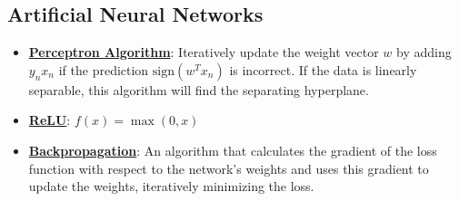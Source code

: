 \documentclass{article}%
\begin{document}
%
\subsection{Artificial Neural Networks}%
\label{subsec:ArtificialNeuralNetworks}%
\begin{itemize}[leftmargin=*]%
\item \href{https://purdue.brightspace.com/d2l/common/assets/pdfjs-d2l-dist/1.0.14-legacy/web/viewer.html?file=\%2Fcontent\%2Fenforced\%2F1095467-wl.202510.CS.24300.001\%2F05L2-ML Basics.pdf\%3Fou\%3D1095467\&lang=en-us\&container=d2l-fileviewer-rendered-pdf\&fullscreen=d2l-fileviewer-rendered-pdf-dialog\&height=667#page=30}{\textbf{Perceptron Algorithm}}: Iteratively update the weight vector $w$ by adding $y_nx_n$ if the prediction $\text{sign}(w^Tx_n)$ is incorrect. If the data is linearly separable, this algorithm will find the separating hyperplane.%
\item \href{https://purdue.brightspace.com/d2l/common/assets/pdfjs-d2l-dist/1.0.14-legacy/web/viewer.html?file=\%2Fcontent\%2Fenforced\%2F1095467-wl.202510.CS.24300.001\%2F09L1-cnn.pdf\%3Fou\%3D1095467\&lang=en-us\&container=d2l-fileviewer-rendered-pdf\&fullscreen=d2l-fileviewer-rendered-pdf-dialog\&height=667#page=13}{\textbf{ReLU}}: $f(x) = \max(0, x)$%
\item \href{https://purdue.brightspace.com/d2l/common/assets/pdfjs-d2l-dist/1.0.14-legacy/web/viewer.html?file=\%2Fcontent\%2Fenforced\%2F1095467-wl.202510.CS.24300.001\%2F09L1-cnn.pdf\%3Fou\%3D1095467\&lang=en-us\&container=d2l-fileviewer-rendered-pdf\&fullscreen=d2l-fileviewer-rendered-pdf-dialog\&height=667#page=16}{\textbf{Backpropagation}}: An algorithm that calculates the gradient of the loss function with respect to the network's weights and uses this gradient to update the weights, iteratively minimizing the loss.%
\end{itemize}

%
\end{document}
